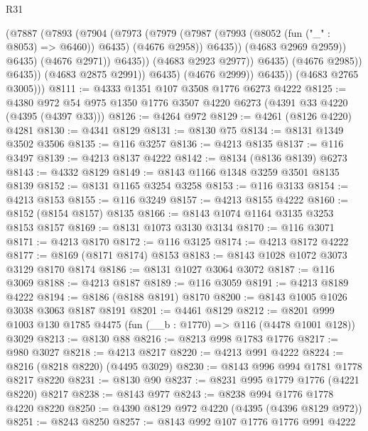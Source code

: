 \begin{lexlean}{R31}
\begin{coremodule}
                                (@7887
                                  (@7893
                                    (@7904
                                      (@7973
                                        (@7979
                                          (@7987
                                            (@7993 (@8052 (fun ("_" : @8053) => @6460)) @6435)
                                            (@4676 @2958))
                                          @6435))
                                      (@4683 @2969 @2959))
                                    @6435)
                                  (@4676 @2971))
                                @6435))
                            (@4683 @2923 @2977))
                          @6435)
                        (@4676 @2985))
                      @6435))
                  (@4683 @2875 @2991))
                @6435)
              (@4676 @2999))
            @6435))
        (@4683 @2765 @3005)))
@8111 := @4333 @1351 @107 @3508 @1776 @6273 @4222
@8125 := @4380 @972 @54 @975 @1350 @1776 @3507 @4220 @6273 (@4391 @33 @4220 (@4395 (@4397 @33)))
@8126 := @4264 @972
@8129 := @4261 (@8126 @4220) @4281
@8130 := @4341 @8129
@8131 := @8130 @75
@8134 := @8131 @1349 @3502 @3506
@8135 := @116 @3257
@8136 := @4213 @8135
@8137 := @116 @3497
@8139 := @4213 @8137 @4222
@8142 := @8134 (@8136 @8139) @6273
@8143 := @4332 @8129
@8149 := @8143 @1166 @1348 @3259 @3501 @8135 @8139
@8152 := @8131 @1165 @3254 @3258
@8153 := @116 @3133
@8154 := @4213 @8153
@8155 := @116 @3249
@8157 := @4213 @8155 @4222
@8160 := @8152 (@8154 @8157) @8135
@8166 := @8143 @1074 @1164 @3135 @3253 @8153 @8157
@8169 := @8131 @1073 @3130 @3134
@8170 := @116 @3071
@8171 := @4213 @8170
@8172 := @116 @3125
@8174 := @4213 @8172 @4222
@8177 := @8169 (@8171 @8174) @8153
@8183 := @8143 @1028 @1072 @3073 @3129 @8170 @8174
@8186 := @8131 @1027 @3064 @3072
@8187 := @116 @3069
@8188 := @4213 @8187
@8189 := @116 @3059
@8191 := @4213 @8189 @4222
@8194 := @8186 (@8188 @8191) @8170
@8200 := @8143 @1005 @1026 @3038 @3063 @8187 @8191
@8201 := @4461 @8129
@8212 := @8201 @999 @1003 @130 @1785 @4475 (fun (__b : @1770) => @116 (@4478 @1001 @128)) @3029
@8213 := @8130 @88
@8216 := @8213 @998 @1783 @1776
@8217 := @980 @3027
@8218 := @4213 @8217
@8220 := @4213 @991 @4222
@8224 := @8216 (@8218 @8220) (@4495 @3029)
@8230 := @8143 @996 @994 @1781 @1778 @8217 @8220
@8231 := @8130 @90
@8237 := @8231 @995 @1779 @1776 (@4221 @8220) @8217
@8238 := @8143 @977
@8243 := @8238 @994 @1776 @1778 @4220 @8220
@8250 := @4390 @8129 @972 @4220 (@4395 (@4396 @8129 @972))
@8251 := @8243 @8250
@8257 := @8143 @992 @107 @1776 @1776 @991 @4222

\end{coremodule}
\end{lexlean}
